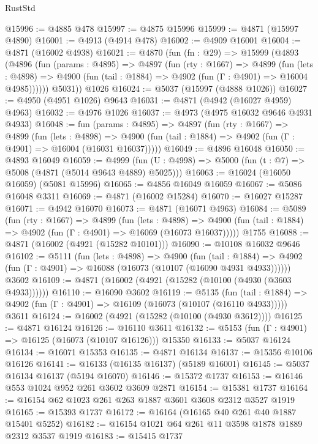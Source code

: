 \begin{lexlean}{RustStd}
\begin{coremodule}
@15996 := @4885 @478
@15997 := @4875 @15996
@15999 := @4871 (@15997 @4890)
@16001 := @4913 (@4914 @478)
@16002 := @4909 @16001
@16004 := @4871 (@16002 @4938)
@16021 := @4870
    (fun (fn : @29) =>
    @15999
      (@4893
        (@4896
          (fun (params : @4895) =>
          @4897
            (fun (rty : @1667) =>
            @4899
              (fun (lets : @4898) =>
              @4900 (fun (tail : @1884) => @4902 (fun (Γ : @4901) => @16004 @4985))))))
        @5031))
    @1026
@16024 := @5037 (@15997 (@4888 @1026))
@16027 := @4950 (@4951 @1026) @9643
@16031 := @4871 (@4942 (@16027 @4959) @4963)
@16032 := @4976 @1026
@16037 := @4973 (@4975 @16032 @9646 @4931 @4933)
@16048 := fun (params : @4895) =>
  @4897
    (fun (rty : @1667) =>
    @4899
      (fun (lets : @4898) =>
      @4900 (fun (tail : @1884) => @4902 (fun (Γ : @4901) => @16004 (@16031 @16037)))))
@16049 := @4896 @16048
@16050 := @4893 @16049
@16059 := @4999 (fun (U : @4998) => @5000 (fun (t : @7) => @5008 (@4871 (@5014 @9643 @4889) @5025)))
@16063 := @16024 (@16050 @16059) (@5081 @15996)
@16065 := @4856 @16049 @16059
@16067 := @5086 @16048 @3311
@16069 := @4871 (@16002 @15284)
@16070 := @16027 @15287
@16071 := @4942 @16070
@16073 := @4871 (@16071 @4963)
@16084 := @5089
    (fun (rty : @1667) =>
    @4899
      (fun (lets : @4898) =>
      @4900 (fun (tail : @1884) => @4902 (fun (Γ : @4901) => @16069 (@16073 @16037)))))
    @1755
@16088 := @4871 (@16002 (@4921 (@15282 @10101)))
@16090 := @10108 @16032 @9646
@16102 := @5111
    (fun (lets : @4898) =>
    @4900
      (fun (tail : @1884) =>
      @4902 (fun (Γ : @4901) => @16088 (@16073 (@10107 (@16090 @4931 @4933))))))
    @3602
@16109 := @4871 (@16002 (@4921 (@15282 (@10100 (@4930 (@3603 @4933))))))
@16110 := @16090 @3602
@16119 := @5135
    (fun (tail : @1884) => @4902 (fun (Γ : @4901) => @16109 (@16073 (@10107 (@16110 @4933)))))
    @3611
@16124 := @16002 (@4921 (@15282 (@10100 (@4930 @3612))))
@16125 := @4871 @16124
@16126 := @16110 @3611
@16132 := @5153 (fun (Γ : @4901) => @16125 (@16073 (@10107 @16126))) @15350
@16133 := @5037 @16124
@16134 := @16071 @15353
@16135 := @4871 @16134
@16137 := @15356 @10106 @16126
@16141 := @16133 (@16135 @16137) (@5189 @16001)
@16145 := @5037 @16134 @16137 (@5194 @16070)
@16146 := @15372 @1737
@16153 := @16146 @553 @1024 @952 @261 @3602 @3609 @2871
@16154 := @15381 @1737
@16164 := @16154 @62 @1023 @261 @263 @1887 @3601 @3608 @2312 @3527 @1919
@16165 := @15393 @1737
@16172 := @16164 (@16165 @40 @261 @40 @1887 @15401 @5252)
@16182 := @16154 @1021 @64 @261 @11 @3598 @1878 @1889 @2312 @3537 @1919
@16183 := @15415 @1737

\end{coremodule}
\end{lexlean}
